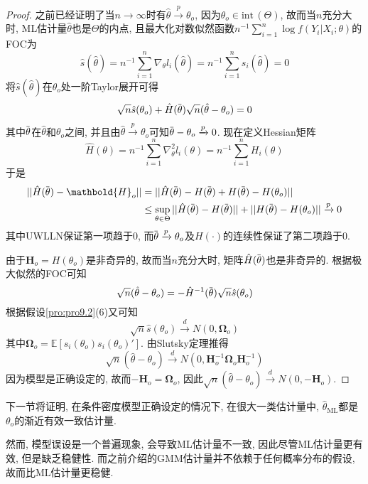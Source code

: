 \documentclass[cn, 12pt, math=mtpro2, bibstyle=apa, blue, twocol]{elegantbook}
\newcommand{\E}{\mathbb{E}}
\newcommand{\BO}{\mathbold{\Omega}}
\newcommand{\overbar}[1]{\mkern 1.5mu\overline{\mkern-1.5mu#1\mkern-1.5mu}\mkern 1.5mu}
\begin{document}
\begin{proof}
  之前已经证明了当$n\to\infty$时有$\hat{\theta}\xrightarrow{p}\theta_o$, 因为$\theta_o\in\text{int}\,(\Theta)$, 故而当$n$充分大时, ML估计量$\hat{\theta}$也是$\Theta$的内点, 且最大化对数似然函数$n^{-1}\sum_{i=1}^{n}\log f(Y_i|X_i;\theta)$的FOC为
  \begin{equation}\label{eq9.28}
    \hat{s}(\hat{\theta})=n^{-1}\sum_{i=1}^{n}\nabla_\theta l_i(\hat{\theta})=n^{-1}\sum_{i=1}^{n}s_i(\hat{\theta})=0
  \end{equation}
  将$\hat{s}(\hat{\theta})$在$\theta_o$处一阶Taylor展开可得
  \begin{align*}
  \sqrt{n}\hat{s}(\theta_o)+\hat{H}(\overbar{\theta})\sqrt{n}(\hat{\theta}-\theta_o)=0
  \end{align*}
  其中$\overbar{\theta}$在$\hat{\theta}$和$\theta_o$之间, 并且由$\hat{\theta}\xrightarrow{p}\theta_o$可知$\overbar{\theta}-\theta_o\xrightarrow{p}0$. 现在定义Hessian矩阵
  $$\hat{H}(\theta)=n^{-1}\sum_{i=1}^{n}\nabla_\theta^2 l_i(\theta)=n^{-1}\sum_{i=1}^{n}H_i(\theta)$$
  于是
  \begin{align*}
  ||\hat{H}(\overbar{\theta})-\mathbold{H}_o||&=||\hat{H}(\overbar{\theta})-H(\overbar{\theta})+H(\overbar{\theta})-H(\theta_o)|| \\
  &\leq \sup_{\theta\in\Theta}||\hat{H}(\overbar{\theta})-H(\overbar{\theta})||+||H(\overbar{\theta})-H(\theta_o)||\xrightarrow{p}0
  \end{align*}
  其中UWLLN保证第一项趋于0, 而$\overbar{\theta}\xrightarrow{p}\theta_o$及$H(\cdot)$的连续性保证了第二项趋于0.

  由于$\mathbold{H}_o=H(\theta_o)$是非奇异的, 故而当$n$充分大时, 矩阵$\hat{H}(\overbar{\theta})$也是非奇异的. 根据极大似然的FOC可知
  $$\sqrt{n}(\hat{\theta}-\theta_o)=-\hat{H}^{-1}(\overbar{\theta})\sqrt{n}\hat{s}(\theta_o)$$
  根据假设\ref{pro:pro9.2}(6)又可知
  $$\sqrt{n}\hat{s}(\theta_o)\xrightarrow{d}N(0,\BO_o)$$
  其中$\BO_o=\E[s_i(\theta_o)s_i(\theta_o)']$. 由Slutsky定理推得
  $$\sqrt{n}(\hat{\theta}-\theta_o)\xrightarrow{d} N(0,\mathbold{H}_o^{-1}\BO_o\mathbold{H}_o^{-1})$$
  因为模型是正确设定的, 故而$-\mathbold{H}_o=\BO_o$, 因此$\sqrt{n}(\hat{\theta}-\theta_o)\xrightarrow{d} N(0,-\mathbold{H}_o)$.
\end{proof}
下一节将证明, 在条件密度模型正确设定的情况下, 在很大一类估计量中, $\hat{\theta}_\text{ML}$都是$\theta_o$的渐近有效一致估计量.

然而, 模型误设是一个普遍现象, 会导致ML估计量不一致, 因此尽管ML估计量更有效, 但是缺乏稳健性. 而之前介绍的GMM估计量并不依赖于任何概率分布的假设, 故而比ML估计量更稳健.
\end{document}
